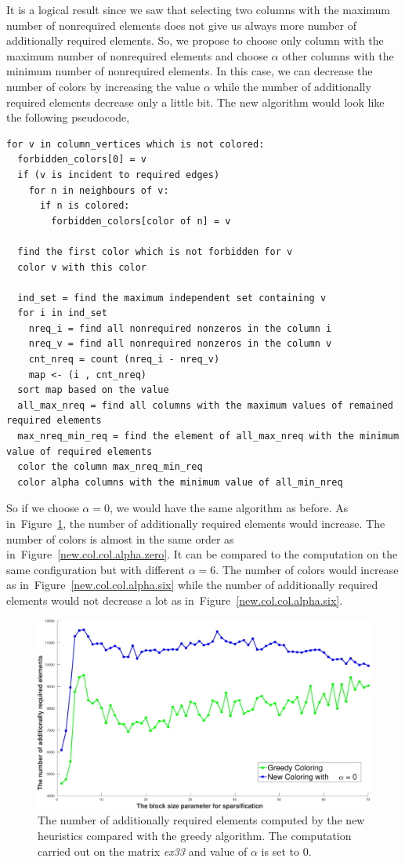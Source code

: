 \documentclass[12pt, oneside]{book}
\newcommand{\figref}[1]{Figure~\protect\ref{#1}}
\begin{document}
It is a logical result since we saw that selecting two columns with the maximum number of nonrequired
elements does not give us always more number of additionally required elements.
So, we propose to choose only column with the maximum number of nonrequired elements and
choose $\alpha$ other columns with the minimum number of nonrequired elements. In this case, 
we can decrease the number of colors by increasing the value $\alpha$ while the number of
additionally required elements decrease only a little bit.
The new algorithm would look like the following pseudocode,
\begin{lstlisting}
for v in column_vertices which is not colored:
  forbidden_colors[0] = v
  if (v is incident to required edges) 
    for n in neighbours of v:
      if n is colored:
        forbidden_colors[color of n] = v

  find the first color which is not forbidden for v
  color v with this color

  ind_set = find the maximum independent set containing v
  for i in ind_set
    nreq_i = find all nonrequired nonzeros in the column i
    nreq_v = find all nonrequired nonzeros in the column v
    cnt_nreq = count (nreq_i - nreq_v)
    map <- (i , cnt_nreq)
  sort map based on the value
  all_max_nreq = find all columns with the maximum values of remained required elements
  max_nreq_min_req = find the element of all_max_nreq with the minimum value of required elements
  color the column max_nreq_min_req
  color alpha columns with the minimum value of all_min_nreq
\end{lstlisting}
So if we choose $\alpha=0$, we would have the same algorithm as before.
As in~\figref{new.col.add.alpha.zero}, the number of additionally required elements  
would increase. The number of colors is almost in the same order as in~\figref{new.col.col.alpha.zero}.
It can be compared to the computation on the same configuration but with different $\alpha=6$.
The number of colors would increase as in~\figref{new.col.col.alpha.six} while
the number of additionally required elements would not decrease a lot as in~\figref{new.col.col.alpha.six}.
\begin{figure}
\centering
\includegraphics[width=0.9\linewidth]{bls_add_alpha_0}
\caption{The number of additionally required elements computed by the new heuristics compared with the 
greedy algorithm. The computation carried out on the matrix \textit{ex33} and value of $\alpha$ is 
set to $0$.}
\label{new.col.add.alpha.zero}
\end{figure}
\end{document}
